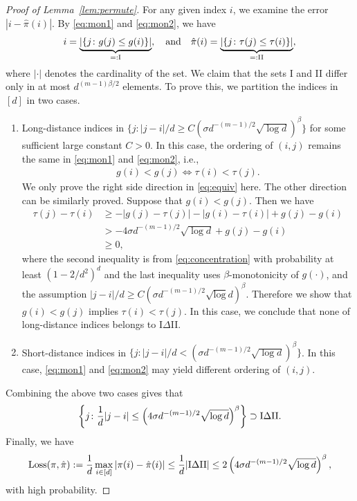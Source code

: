 \documentclass[12pt]{article}
\theoremstyle{definition}
\begin{document}
\begin{proof}[Proof of Lemma~\ref{lem:permute}]
For any given index $i$, we examine the error $|i-\hat\pi(i)|$. By \eqref{eq:mon1} and \eqref{eq:mon2}, we have
\begin{align}
    i = \underbrace{|\{j\colon g(j)\leq g(i)\}|}_{=:\textup{I}},\quad\text{and}\quad \hat\pi(i) = \underbrace{|\{j\colon \tau(j)\leq \tau(i)\}|}_{=:\textup{II}},
\end{align}
where $|\cdot|$ denotes the cardinality of the set. We claim that the sets I and II differ only in at most $d^{(m-1)\beta/2}$ elements. To prove this, we partition the indices in $[d]$ in two cases.
\begin{enumerate}
    \item Long-distance indices in $\{j\colon|j-i|/d\geq 
C \left(\sigma d^{-(m-1)/2}\sqrt{\log d}\right)^{\beta} \}$ for some sufficient large constant $C>0$. In this case, the ordering of $(i,j)$ remains the same in \eqref{eq:mon1} and \eqref{eq:mon2}, i.e.,
    \begin{align}\label{eq:equiv}
        g(i) < g(j) \Longleftrightarrow \tau(i) < \tau(j).
    \end{align}
    We only prove the right side direction in  \eqref{eq:equiv} here. The other direction can be similarly proved.
    Suppose that $g(i) < g(j)$. Then we have
    \begin{align}
        \tau(j)-\tau(i) &\geq -|g(j)-\tau(j)|-|g(i)-\tau(i)| + g(j)-g(i)
       \\& > -4\sigma d^{-(m-1)/2}\sqrt{\log d} + g(j)-g(i)
       \\&\geq 0,
    \end{align}
    where the second inequality is from \eqref{eq:concentration} with probability at least $(1-2/d^2)^d$ and the last inequality uses $\beta$-monotonicity of $g(\cdot)$, and the assumption
    $|j-i|/d\geq C\left(\sigma d^{-(m-1)/2}\sqrt{\log} d\right)^{\beta}$. Therefore we show that $g(i)<g(j)$ implies $\tau(i)<\tau(j).$
    In this case, we conclude that none of long-distance indices belongs to I$\Delta$II.
    \item Short-distance indices in $\{j\colon|j-i|/d< \left(\sigma d^{-(m-1)/2}\sqrt{\log d}\right)^{\beta} \}$. In this case, \eqref{eq:mon1} and \eqref{eq:mon2} may yield different ordering of $(i,j).$
\end{enumerate}
Combining the above two cases gives that 
\begin{align}
   \left \{j\colon\frac{1}{d}|j-i|\leq \left(4\sigma d^{-(m-1)/2}\sqrt{\log d}\right)^{\beta}\right \}\supset \textup{I}\Delta\textup{II}.
\end{align}
Finally, we have
\begin{align}
    \textup{Loss}(\pi,\hat\pi) := \frac{1}{d}\max_{i\in[d]}|\pi(i)-\hat\pi(i)|\leq\frac{1}{d}|\textup{I}\Delta\textup{II}|\leq 2\left(4\sigma d^{-(m-1)/2}\sqrt{\log d}\right)^{\beta},
\end{align}
with high probability.
\end{proof}
\end{document}
